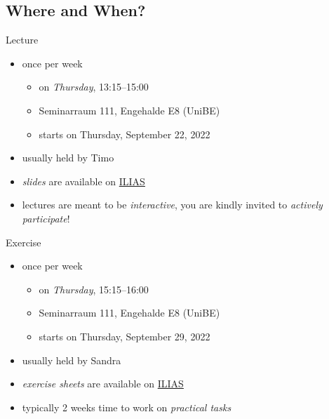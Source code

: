 \subsection{Where and When?}

\begin{frame}{\myframetitle}
	\begin{fancycolumns}
		\begin{definition}{Lecture}
			\begin{itemize}
				\item once per week
				\begin{itemize}
					\item on \emph{Thursday}, 13:15--15:00
					\item Seminarraum 111, Engehalde E8 (UniBE)
					\item starts on Thursday, September 22, 2022
				\end{itemize}
				\item usually held by Timo
				\item \emph{slides} are available on \href{https://ilias.unibe.ch/goto_ilias3_unibe_crs_2469231.html}{ILIAS}
				\item lectures are meant to be \emph{interactive}, you are kindly invited to \emph{actively participate}!
			\end{itemize}
		\end{definition}
	\nextcolumn
		\begin{example}{Exercise}
			\begin{itemize}
				\item once per week 
				\begin{itemize}
					\item on \emph{Thursday}, 15:15--16:00
					\item Seminarraum 111, Engehalde E8 (UniBE)
					\item starts on Thursday, September 29, 2022
				\end{itemize}
				\item usually held by Sandra
				\item \emph{exercise sheets} are available on \href{https://ilias.unibe.ch/goto_ilias3_unibe_crs_2469231.html}{ILIAS}
				\item typically 2 weeks time to work on \emph{practical tasks}
			\end{itemize}
		\end{example}
	\end{fancycolumns}
\end{frame}

